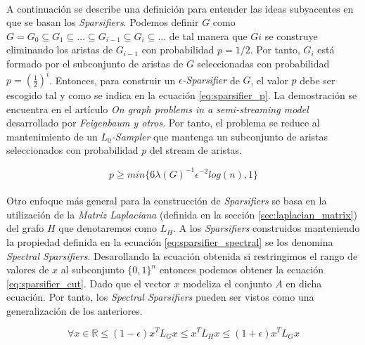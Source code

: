 \documentclass{subfiles}
\begin{document}
        \paragraph{}
        A continuación se describe una definición para entender las ideas subyacentes en que se basan los \emph{Sparsifiers}. Podemos definir $G$ como $G = G_0 \subseteq G_1 \subseteq ...  \subseteq G_{i-1} \subseteq G_i \subseteq ... $ de tal manera que $Gi$ se construye eliminando los aristas de $G_{i-1}$ con probabilidad $p = 1/2$. Por tanto, $G_i$ está formado por el subconjunto de aristas de $G$ seleccionadas con probabilidad $p = (\frac{1}{2})^i$. Entonces, para construir un \emph{$\epsilon$-Sparsifier} de $G$, el valor $p$ debe ser escogido tal y como se indica en la ecuación \eqref{eq:sparsifier_p}. La demostración se encuentra en el artículo \emph{On graph problems in a semi-streaming model} \cite{feigenbaum2005graph} desarrollado por \emph{Feigenbaum y otros}. Por tanto, el problema se reduce al mantenimiento de un \emph{$L_{0}$-Sampler} que mantenga un subconjunto de aristas seleccionados con probabilidad $p$ del stream de aristas.

        \begin{equation}
        \label{eq:sparsifier_p}
          p \geq min\{6\lambda(G)^{-1}\epsilon^{-2}log(n),1\}
        \end{equation}

        \paragraph{}
        Otro enfoque más general para la construcción de \emph{Sparsifiers} se basa en la utilización de la \emph{Matriz Laplaciana} (definida en la sección \ref{sec:laplacian_matrix}) del grafo $H$ que denotaremos como $L_{H}$. A los \emph{Sparsifiers} construidos manteniendo la propiedad definida en la ecuación \eqref{eq:sparsifier_spectral} se los denomina \emph{Spectral Sparsifiers}. Desarollando la ecuación obtenida si restringimos el rango de valores de $x$ al subconjunto $\{ 0, 1\}^n$ entonces podemos obtener la ecuación \ref{eq:sparsifier_cut}. Dado que el vector $x$ modeliza el conjunto $A$ en dicha ecuación. Por tanto, los \emph{Spectral Sparsifiers} pueden ser vistos como una generalización de los anteriores.

        \begin{equation}
        \label{eq:sparsifier_spectral}
          \forall x \in \mathbb{R} \leq (1 - \epsilon) x^TL_{G}x \leq x^TL_{H}x \leq (1 + \epsilon) x^TL_{G}x
        \end{equation}
\end{document}
